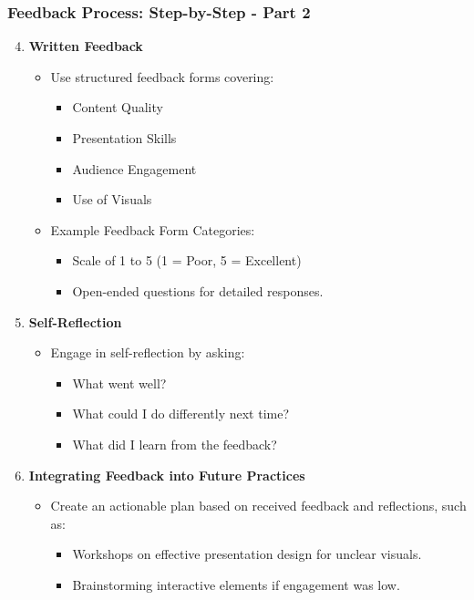 \documentclass[aspectratio=169]{beamer}
\begin{document}
\begin{frame}[fragile]
    \frametitle{Feedback Process: Step-by-Step - Part 2}
    \begin{enumerate}
        \setcounter{enumi}{3} %
        \item \textbf{Written Feedback}
            \begin{itemize}
                \item Use structured feedback forms covering:
                    \begin{itemize}
                        \item Content Quality
                        \item Presentation Skills
                        \item Audience Engagement
                        \item Use of Visuals
                    \end{itemize}
                \item Example Feedback Form Categories:
                    \begin{itemize}
                        \item Scale of 1 to 5 (1 = Poor, 5 = Excellent)
                        \item Open-ended questions for detailed responses.
                    \end{itemize}
            \end{itemize}

        \item \textbf{Self-Reflection}
            \begin{itemize}
                \item Engage in self-reflection by asking:
                    \begin{itemize}
                        \item What went well?
                        \item What could I do differently next time?
                        \item What did I learn from the feedback?
                    \end{itemize}
            \end{itemize}

        \item \textbf{Integrating Feedback into Future Practices}  
            \begin{itemize}
                \item Create an actionable plan based on received feedback and reflections, such as:
                    \begin{itemize}
                        \item Workshops on effective presentation design for unclear visuals.
                        \item Brainstorming interactive elements if engagement was low.
                    \end{itemize}
            \end{itemize}
    \end{enumerate}
\end{frame}
\end{document}
